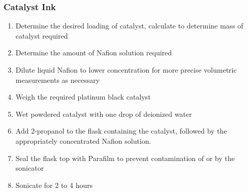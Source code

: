 \documentclass{article}
\begin{document}
		\subsubsection{Catalyst Ink}
			\begin{enumerate}
			\item Determine the desired loading of catalyst, calculate to determine mass of catalyst required
			\item Determine the amount of Nafion solution required
			\item Dilute liquid Nafion to lower concentration for more precise volumetric measurements as necessary
			\item Weigh the required platinum black catalyst
			\item Wet powdered catalyst with one drop of deionized water
			\item Add 2-propanol to the flask containing the catalyst, followed by the appropriately concentrated Nafion solution.
			\item Seal the flask top with Parafilm to prevent contamination of or by the sonicator
			\item Sonicate for 2 to 4 hours
			\end{enumerate}
\end{document}
